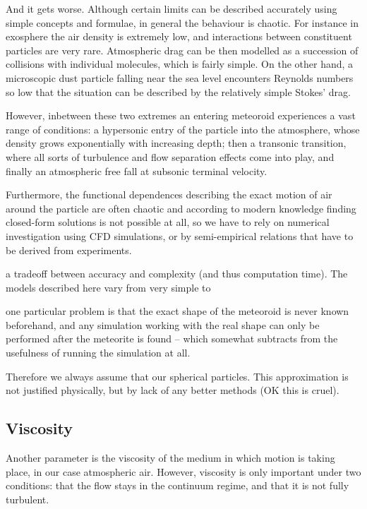         And it gets worse. Although certain limits can be described accurately using
        simple concepts and formulae, in general the behaviour is chaotic.
        For instance in exosphere the air density is extremely low,
        and interactions between constituent particles are very rare.
        Atmospheric drag can be then modelled as a succession of collisions with individual
        molecules, which is fairly simple.
        On the other hand, a microscopic dust particle falling near the sea level encounters
        Reynolds numbers so low that the situation can be described by the relatively simple Stokes' drag.

        However, inbetween these two extremes an entering meteoroid experiences a vast range of conditions:
        a hypersonic entry of the particle into the atmosphere, whose density grows exponentially with increasing depth;
        then a transonic transition, where all sorts of turbulence and flow separation effects come into play,
        and finally an atmospheric free fall at subsonic terminal velocity.

        Furthermore, the functional dependences describing the exact motion
        of air around the particle are often chaotic and according to modern knowledge
        finding closed-form solutions is not possible at all, so we have to rely
        on numerical investigation using CFD simulations, or by semi-empirical
        relations that have to be derived from experiments.


        a tradeoff between accuracy and complexity (and thus computation time).
        The models described here vary from very simple to 

        one particular problem is that the exact shape of the meteoroid is never known beforehand,
        and any simulation working with the real shape can only be performed after the meteorite is
        found -- which somewhat subtracts from the usefulness of running the simulation at all.

        Therefore we always assume that our spherical particles.
        This approximation is not justified physically, but by lack of any better methods (OK this is cruel).

    \subsection{Viscosity} \label{fdv}
        Another parameter is the viscosity of the medium in which
        motion is taking place, in our case atmospheric air.
        However, viscosity is only important under two conditions: that the flow stays
        in the continuum regime, and that it is not fully turbulent.

